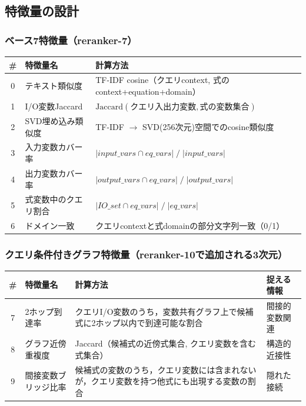 \documentclass[11pt,a4paper]{ltjsarticle}
\begin{document}
\subsection{特徴量の設計}

\subsubsection{ベース7特徴量（reranker-7）}

\begin{table}[h]
\centering
\begin{tabular}{clp{8cm}}
\toprule
\# & 特徴量名 & 計算方法 \\
\midrule
0 & テキスト類似度 & TF-IDF cosine（クエリcontext, 式のcontext+equation+domain） \\
1 & I/O変数Jaccard & $\mathrm{Jaccard}(\text{クエリ入出力変数}, \text{式の変数集合})$ \\
2 & SVD埋め込み類似度 & TF-IDF $\to$ SVD(256次元)空間でのcosine類似度 \\
3 & 入力変数カバー率 & $|\mathit{input\_vars} \cap \mathit{eq\_vars}| \;/\; |\mathit{input\_vars}|$ \\
4 & 出力変数カバー率 & $|\mathit{output\_vars} \cap \mathit{eq\_vars}| \;/\; |\mathit{output\_vars}|$ \\
5 & 式変数中のクエリ割合 & $|\mathit{IO\_set} \cap \mathit{eq\_vars}| \;/\; |\mathit{eq\_vars}|$ \\
6 & ドメイン一致 & クエリcontextと式domainの部分文字列一致（0/1） \\
\bottomrule
\end{tabular}
\end{table}

\subsubsection{クエリ条件付きグラフ特徴量（reranker-10で追加される3次元）}

\begin{table}[h]
\centering
\begin{tabular}{clp{5.5cm}l}
\toprule
\# & 特徴量名 & 計算方法 & 捉える情報 \\
\midrule
7 & 2ホップ到達率 & クエリI/O変数のうち，変数共有グラフ上で候補式に2ホップ以内で到達可能な割合 & 間接的変数関連 \\
8 & グラフ近傍重複度 & Jaccard（候補式の近傍式集合, クエリ変数を含む式集合） & 構造的近接性 \\
9 & 間接変数ブリッジ比率 & 候補式の変数のうち，クエリ変数には含まれないが，クエリ変数を持つ他式にも出現する変数の割合 & 隠れた接続 \\
\bottomrule
\end{tabular}
\end{table}
\end{document}
